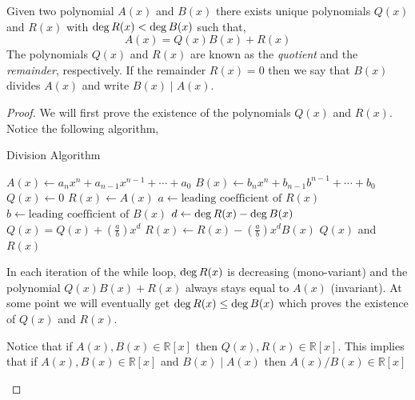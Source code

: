 \begin{theorem}\label{thm:division-algorithm}
    Given two polynomial $A(x)$ and $B(x)$ there exists unique polynomials $Q(x)$ and $R(x)$ with $\operatorname{deg} R(x) < \operatorname{deg} B(x)$ 
    such that,
    \[
        A(x) = Q(x)B(x) + R(x)
    \]
    The polynomials $Q(x)$ and $R(x)$ are known as the \textit{quotient} and the \textit{remainder}, respectively. If the 
    remainder $R(x)=0$ then we say that $B(x)$ divides $A(x)$ and write $B(x) \mid A(x)$.
\end{theorem}
\begin{proof}
    We will first prove the existence of the polynomials $Q(x)$ and $R(x)$. 
    Notice the following algorithm,
    \begin{algorithm}
    \caption{Division Algorithm}
    \begin{algorithmic}
        \State $A(x) \gets a_{n}x^{n} + a_{n-1}x^{n-1}+\cdots+a_{0}$
        \State $B(x) \gets b_{n}x^{n} + b_{n-1}b^{n-1}+\cdots+b_{0}$
        \State $Q(x) \gets 0$
        \State $R(x) \gets A(x)$
            \State $a \gets \text{leading coefficient of }R(x)$
            \State $b \gets \text{leading coefficient of }B(x)$
            \State $d \gets \operatorname{deg} R(x) - \operatorname{deg} B(x)$
            \State $Q(x) = Q(x) + \left(\frac{a}{b}\right)x^{d}$
            \State $R(x) \gets R(x) - \left(\frac{a}{b}\right)x^{d}B(x)$
        \EndWhile
        \Output $Q(x)$ and $R(x)$
    \end{algorithmic}
    \end{algorithm}

    In each iteration of the while loop, $\operatorname{deg} R(x)$ is decreasing (mono-variant) and 
    the polynomial $Q(x)B(x) + R(x)$ always stays equal to $A(x)$ (invariant). 
    At some point we will eventually get $\operatorname{deg} R(x) \leq \operatorname{deg} B(x)$ which proves the existence of $Q(x)$ and $R(x)$.

    \begin{remark}
        Notice that if $A(x), B(x) \in \mathbb{R}[x]$ then $Q(x), R(x) \in \mathbb{R}[x]$. This implies that 
        if $A(x), B(x) \in \mathbb{R}[x]$ and $B(x)\mid A(x)$ then $A(x)/B(x) \in \mathbb{R}[x]$
    \end{remark}


\end{proof}
